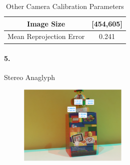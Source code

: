 \documentclass[10pt,twocolumn,letterpaper]{article}
\begin{document}
\begin{table}[h]
\small
    \centering
    \begin{tabular}{c|c}
        Image Size & [454,605]\\ 
        \hline
        Mean Reprojection Error & 0.241\\ 
    \end{tabular}%
    \medbreak
    \caption{Other Camera Calibration Parameters}
\end{table}

\clearpage

\paragraph{5.}Stereo Anaglyph

\begin{figure}[h]
\begin{center}
   \includegraphics[width=0.46\textwidth]{5.20}
\end{center}
\end{figure}
\end{document}
